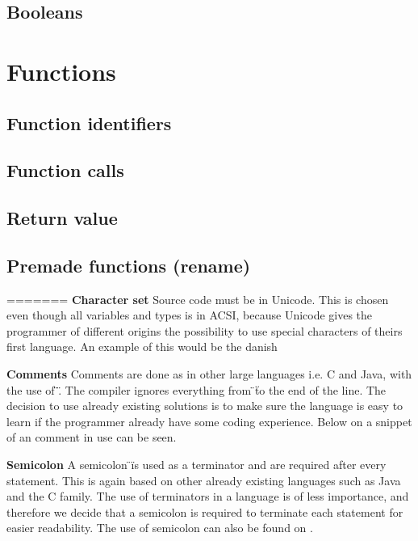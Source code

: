 \subsection{Booleans}

\section{Functions}
\subsection{Function identifiers}

\subsection{Function calls}

\subsection{Return value}

\subsection{Premade functions (rename)}

%


=======
\textbf{Character set}
Source code must be in Unicode.
This is chosen even though all variables and types is in ACSI, because Unicode gives the programmer of different origins the possibility to use special characters of theirs first language.
An example of this would be the danish %

\textbf{Comments}
Comments are done as in other large languages i.e. C and Java, with the use of \"\/\/\".
The compiler ignores everything from \"\/\/\" to the end of the line.
The decision  to use already existing solutions is to make sure the language is easy to learn if the programmer already have some coding experience.
Below on  a snippet of an comment in use can be seen.

\textbf{Semicolon}
A semicolon \"\;\" is used as a terminator and are required after every statement.
This is again based on other already existing languages such as Java and the C family.
The use of terminators in a language is of less importance, and therefore we decide that a semicolon is required to terminate each statement for easier readability.
The use of semicolon can also be found on .



